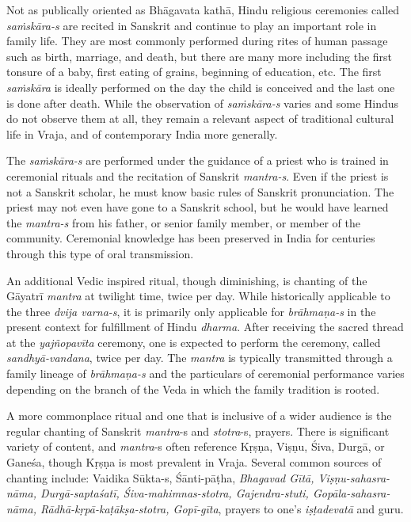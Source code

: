 Not as publically oriented as Bhāgavata kathā, Hindu religious ceremonies called {\sl saṁskāra-s} are recited in Sanskrit and continue to play an important role in family life. They are most commonly performed during rites of human passage such as birth, marriage, and death, but there are many more including the first tonsure of a baby, first eating of grains, beginning of education, etc. The first {\sl saṁskāra} is ideally performed on the day the child is conceived and the last one is done after death. While the observation of {\sl saṁskāra-s} varies and some Hindus do not observe them at all, they remain a relevant aspect of traditional cultural life in Vraja, and of contemporary India more generally.

The {\sl saṁskāra-s} are performed under the guidance of a priest who is trained in ceremonial rituals and the recitation of Sanskrit {\sl mantra-s}. Even if the priest is not a Sanskrit scholar, he must know basic rules of Sanskrit pronunciation. The priest may not even have gone to a Sanskrit school, but he would have learned the {\sl mantra-s} from his father, or senior family member, or member of the community. Ceremonial knowledge has been preserved in India for centuries through this type of oral transmission. 

An additional Vedic inspired ritual, though diminishing, is chanting of the Gāyatrī {\sl mantra} at twilight time, twice per day. While historically applicable to the three {\sl dvija varna-s}, it is primarily only applicable for {\sl brāhmaṇa-s} in the present context for fulfillment of Hindu {\sl dharma}. After receiving the sacred thread at the {\sl yajñopavīta} ceremony, one is expected to perform the ceremony, called {\sl sandhyā-vandana}, twice per day. The {\sl mantra} is typically transmitted through a family lineage of {\sl brāhmaṇa-s} and the particulars of ceremonial performance varies depending on the branch of the  Veda in which the family tradition is rooted. 

A more commonplace ritual and one that is inclusive of a wider audience is the regular chanting of Sanskrit {\sl mantra}-s and {\sl stotra}-s, prayers. There is significant variety of content, and {\sl mantra}-s often reference Kṛṣṇa, Viṣṇu, Śiva, Durgā, or Ganeśa, though Kṛṣṇa is most prevalent in Vraja. Several common sources of chanting include: Vaidika Sūkta-s, Śānti-pāṭha, {\sl Bhagavad Gītā, Viṣṇu-sahasra-nāma, Durgā-saptaśatī, Śiva-mahimnas-stotra, Gajendra-stuti, Gopāla-sahasra-nāma, Rādhā-kṛpā-kaṭākṣa-stotra, Gopī-gīta}, prayers to one’s {\sl iṣṭadevatā} and guru. 

